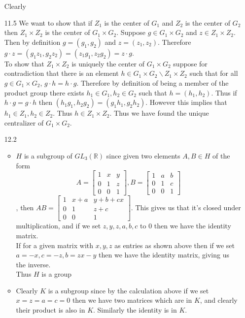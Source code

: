 \documentclass[12pt, letterpaper]{article}
\newcommand{\R}{\mathbb{R}}
\begin{document}
\begin{enumerate}
	Clearly $ $ \fi
	\item[11.5]  We want to show that if $Z_1$ is the center of $G_1$ and
	$Z_2$ is the center of $G_2$ then $Z_1 \times Z_2$ is the center of $G_1 \times G_2$.  Suppose $g \in G_1 \times G_2$ and $z \in Z_1 \times Z_2$.
	Then by definition $g = (g_1,g_2)$ and $z = (z_1,z_2)$.  Therefore 
	$g \cdot z = (g_1 z_1, g_2 z_2) = (z_1 g_1, z_2 g_2) = z \cdot g$.\\
	To show that $Z_1 \times Z_2$ is uniquely the center of $G_1 \times G_2$ 
	suppose for contradiction that there is an element 
	$h \in G_1 \times G_2 \backslash Z_1 \times Z_2$ such that
	for all $g \in G_1 \times G_2$, $g \cdot h = h \cdot g$.
	Therefore by definition of being a member of the product group
	there exists $h_1 \in G_1, h_2 \in G_2$ such that $h = (h_1, h_2)$.
	Thus if $h \cdot g = g \cdot h$ then $(h_1g_1, h_2 g_2) = (g_1h_1, g_2h_2)$.  However this implies that $h_1 \in Z_1, h_2   \in Z_2$.
	Thus $h \in Z_1 \times Z_2$.  Thus we have found the unique centralizer of $G_1 \times G_2$.    
	\item[12.2] 
	\begin{itemize}
		\item $H$ is a subgroup of $GL_3(\R)$ since given two elements 
		$A,B \in H$ of the form 
		$$ A = \begin{bmatrix} 1 & x & y\\ 0 & 1 & z\\ 0 & 0 & 1 \end{bmatrix}, B = \begin{bmatrix} 1 & a & b\\ 0 & 1 & c\\ 0 & 0 & 1\end{bmatrix}		 $$, then $AB = \begin{bmatrix}
		1 & x + a & y + b + cx\\ 0 & 1 & z + c\\ 0 & 0 & 1
\end{bmatrix}		 $.  This gives us that it's closed under multiplication, and if we set $z,y,z,a,b,c$ to 0 then we have the identity matrix.\\
If for a given matrix with $x,y,z$ as entries as shown above 
then if we set $a=-x, c=-z, b = zx-y$ then we have the identity matrix, giving us the inverse.\\  Thus $H$ is a group
		\item Clearly $K$ is a subgroup since by the calculation above 
		if we set $x=z=a=c=0$ then we have two matrices which are in $K$, 
		and clearly their product is also in $K$.  Similarly the identity is in $K$. \\

\end{itemize}
\end{enumerate}
\end{document}
